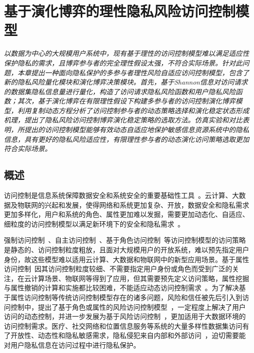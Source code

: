 \chapter{基于演化博弈的理性隐私风险访问控制模型}
\label{chap:evolutionary-rabac}

\textit{ }

\textit{以数据为中心的大规模用户系统中，现有基于理性的访问控制模型难以满足适应性保护隐私的需求，且博弈参与者的完全理性假设太强，不符合实际场景。针对此问题，本章提出一种面向隐私保护的多参与者理性风险自适应访问控制模型，包含了新的隐私风险量化模块和演化博弈决策模块。首先，基于Shannon信息对访问请求的数据集隐私信息量进行量化，构造了访问请求隐私风险函数和用户隐私风险函数；其次，基于演化博弈在有限理性假设下构建多参与者的访问控制演化博弈模型，利用复制动态方程分析了访问控制参与者的动态策略选择和演化稳定状态形成机理，提出了隐私风险访问控制博弈演化稳定策略的选取方法。仿真实验和对比表明，所提出的访问控制模型能够有效动态自适应地保护敏感信息资源系统中的隐私信息，具有更好的隐私风险适应性，有限理性参与者的动态演化访问策略选取更加符合实际场景。}

\section{概述}
访问控制是信息系统保障数据安全和系统安全的重要基础性工具~\cite{sandhu1994access}。云计算、大数据及物联网的兴起和发展，使得网络和系统更加复杂、开放，数据安全和隐私需求更加多样化，用户和系统的角色、属性更加难以发掘，需要更加动态化、自适应、细粒度的访问控制模型以满足新环境下的安全和隐私需求~\cite{li2017access}。

强制访问控制~\cite{mccune2006shamon}、自主访问控制~\cite{downs1985issues}、基于角色访问控制~\cite{sandhu1996role}等访问控制模型的访问策略是静态的、访问控制粒度粗放，且面对大规模用户的开放系统，难以预先指定用户身份，故这些模型难以适用云计算、大数据和物联网中的新型应用场景。基于属性访问控制~\cite{wang2010hierarchical}因其访问控制粒度较细、不需要指定用户身份或角色而受到广泛的关注，在云计算场景、物联网等得到了应用，但其需要预先定义访问策略，属性挖掘与属性撤销的计算和实施都比较困难，不能适应动态访问控制需求~\cite{servos2017current}。为了解决基于属性访问控制等传统访问控制模型存在的诸多问题，风险和信任被先后引入到访问控制中，提出了基于角色或属性的风险访问控制模型~\cite{dimmock2004using,kandala2011attribute,krautsevich2014towards}，一定程度上解决了用户访问的动态控制，并进一步发展为基于风险访问控制~\cite{cheng2007fuzzy,ni2010risk}，更加适用于大数据环境的访问控制需求。医疗、社交网络和位置信息服务等系统的大量多样性数据集访问有了开放性、动态性和隐私敏感需求，隐私侵犯来自内部和外部访问~\cite{boulares2017insider}，迫切需要能对用户隐私信息在访问过程中进行隐私保护。

